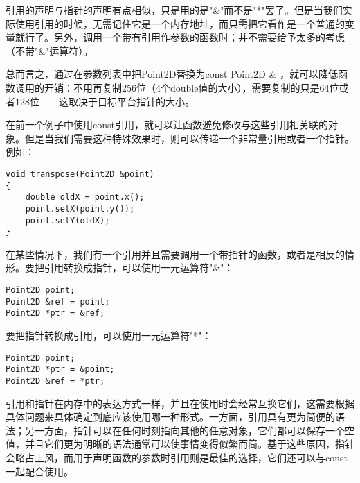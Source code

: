 \documentclass[11pt,oneside]{book}
\begin{document}
\begin{common-format}
引用的声明与指针的声明有点相似，只是用的是"\&{}"而不是"*"罢了。但是当我们实际使用引用的时候，无需记住它是一个内存地址，而只需把它看作是一个普通的变量就行了。另外，调用一个带有引用作参数的函数时；并不需要给予太多的考虑（不带"\&{}"运算符）。

总而言之，通过在参数列表中把Point2D替换为const Point2D \&{} ，就可以降低函数调用的开销：不用再复制256位（4个double值的大小），需要复制的只是64位或者128位——这取决于目标平台指针的大小。

在前一个例子中使用const引用，就可以让函数避免修改与这些引用相关联的对象。但是当我们需要这种特殊效果时，则可以传递一个非常量引用或者一个指针。例如：
\begin{Verbatim}
void transpose(Point2D &point)
{
    double oldX = point.x();
    point.setX(point.y());
    point.setY(oldX);
}
\end{Verbatim}

在某些情况下，我们有一个引用并且需要调用一个带指针的函数，或者是相反的情形。要把引用转换成指针，可以使用一元运算符"\&{}"：
\begin{Verbatim}
Point2D point;
Point2D &ref = point;
Point2D *ptr = &ref;
\end{Verbatim}


要把指针转换成引用，可以使用一元运算符"*"：
\begin{Verbatim}
Point2D point;
Point2D *ptr = &point;
Point2D &ref = *ptr;
\end{Verbatim}

引用和指针在内存中的表达方式一样，并且在使用时会经常互换它们，这需要根据具体问题来具体确定到底应该使用哪一种形式。一方面，引用具有更为简便的语法；另一方面，指针可以在任何时刻指向其他的任意对象，它们都可以保存一个空值，并且它们更为明晰的语法通常可以使事情变得似繁而简。基于这些原因，指针会略占上风，而用于声明函数的参数时引用则是最佳的选择，它们还可以与const一起配合使用。




\end{common-format}  
\end{document}
